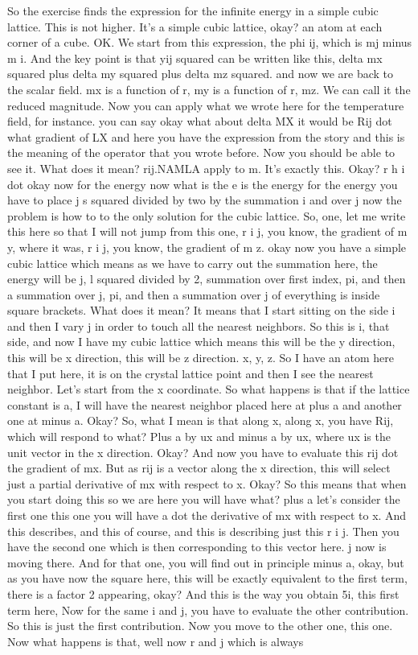 So the exercise finds the expression for the infinite energy in a simple cubic lattice. This is not higher. It's a simple cubic lattice, okay? an atom at each corner of a cube. OK. We start from this expression, the phi ij, which is mj minus m i. And the key point is that yij squared can be written like this, delta mx squared plus delta my squared plus delta mz squared. and now we are back to the scalar field. mx is a function of r, my is a function of r, mz. We can call it the reduced magnitude. Now you can apply what we wrote here for the temperature field, for instance. you can say okay what about delta MX it would be Rij dot what gradient of LX and here you have the expression from the story and this is the meaning of the operator that you wrote before. Now you should be able to see it. What does it mean? rij.NAMLA apply to m. It's exactly this. Okay? r h i dot okay now for the energy now what is the e is the energy for the energy you have to place j s squared divided by two by the summation i and over j now the problem is how to to the only solution for the cubic lattice. So, one, let me write this here so that I will not jump from this one, r i j, you know, the gradient of m y, where it was, r i j, you know, the gradient of m z. okay now you have a simple cubic lattice which means as we have to carry out the summation here, the energy will be j, l squared divided by 2, summation over first index, pi, and then a summation over j, pi, and then a summation over j of everything is inside square brackets. What does it mean? It means that I start sitting on the side i and then I vary j in order to touch all the nearest neighbors. So this is i, that side, and now I have my cubic lattice which means this will be the y direction, this will be x direction, this will be z direction. x, y, z. So I have an atom here that I put here, it is on the crystal lattice point and then I see the nearest neighbor. Let's start from the x coordinate. So what happens is that if the lattice constant is a, I will have the nearest neighbor placed here at plus a and another one at minus a. Okay? So, what I mean is that along x, along x, you have Rij, which will respond to what? Plus a by ux and minus a by ux, where ux is the unit vector in the x direction. Okay? And now you have to evaluate this rij dot the gradient of mx. But as rij is a vector along the x direction, this will select just a partial derivative of mx with respect to x. Okay? So this means that when you start doing this so we are here you will have what? plus a let's consider the first one this one you will have a dot the derivative of mx with respect to x. And this describes, and this of course, and this is describing just this r i j. Then you have the second one which is then corresponding to this vector here. j now is moving there. And for that one, you will find out in principle minus a, okay, but as you have now the square here, this will be exactly equivalent to the first term, there is a factor 2 appearing, okay? And this is the way you obtain 5i, this first term here, Now for the same i and j, you have to evaluate the other contribution. So this is just the first contribution. Now you move to the other one, this one. Now what happens is that, well now r and j which is always 